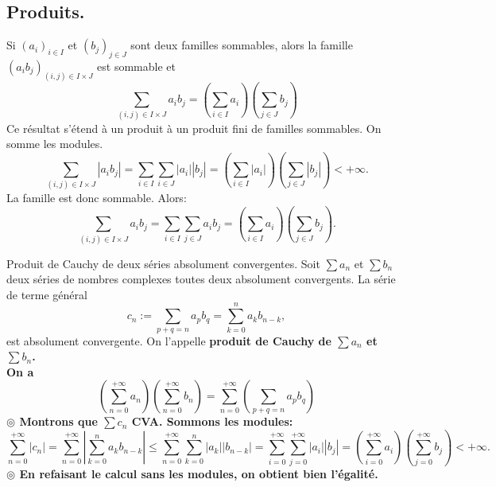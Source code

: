 \documentclass[11pt]{article}
\begin{document}
\subsection{Produits.}

\begin{prop}{}{}
    Si $(a_i)_{i\in I}$ et $(b_j)_{j\in J}$ sont deux familles sommables, alors la famille $(a_ib_j)_{(i,j)\in I\times J}$ est sommable et
    \begin{equation*}
        \sum_{(i,j)\in I\times J}a_ib_j=\left( \sum_{i\in I}a_i \right) \left( \sum_{j\in J} b_j \right)
    \end{equation*}
    Ce résultat s'étend à un produit à un produit fini de familles sommables.
    \tcblower
    On somme les modules.
    \begin{equation*}
        \sum_{(i,j)\in I \times J}|a_ib_j| = \sum_{i\in I}\sum_{i\in J}|a_i||b_j| = \left(\sum_{i\in I}|a_i|\right)\left(\sum_{j\in J}|b_j|\right)<+\infty.
    \end{equation*}
    La famille est donc sommable. Alors:
    \begin{equation*}
        \sum_{(i,j)\in I \times J}a_ib_j = \sum_{i\in I}\sum_{j\in J}a_ib_j = \left( \sum_{i\in I} a_i \right)\left( \sum_{j\in J} b_j \right).
    \end{equation*}
\end{prop}

\pagebreak

\begin{thm}{Produit de Cauchy de deux séries absolument convergentes.}{}
    Soit $\sum a_n$ et $\sum b_n$ deux séries de nombres complexes toutes deux absolument convergents.\n
    La série de terme général
    \begin{equation*}
        c_n:=\sum_{p+q=n}a_pb_q=\sum_{k=0}^na_kb_{n-k},
    \end{equation*}
    est absolument convergente. On l'appelle \bf{produit de Cauchy} de $\sum a_n$ et $\sum b_n$.\\
    On a
    \begin{equation*}
        \left( \sum_{n=0}^{+\infty} a_n \right) \left( \sum_{n=0}^{+\infty} b_n  \right) = \sum_{n=0}^{+\infty} \left( \sum_{p+q=n} a_pb_q \right)
    \end{equation*}
    \tcblower
    $\circledcirc$ Montrons que $\sum c_n$ CVA. Sommons les modules:
    \begin{equation*}
        \sum_{n=0}^{+\infty}|c_n|=\sum_{n=0}^{+\infty}\left|\sum_{k=0}^na_kb_{n-k}\right|\leq\sum_{n=0}^{+\infty}\sum_{k=0}^n|a_k||b_{n-k}|=\sum_{i=0}^{+\infty}\sum_{j=0}^{+\infty}|a_i||b_j|=\left( \sum_{i=0}^{+\infty}a_i \right)\left( \sum_{j=0}^{+\infty} b_j \right)<+\infty.
    \end{equation*}
    $\circledcirc$ En refaisant le calcul sans les modules, on obtient bien l'égalité.
\end{thm}
\end{document}
